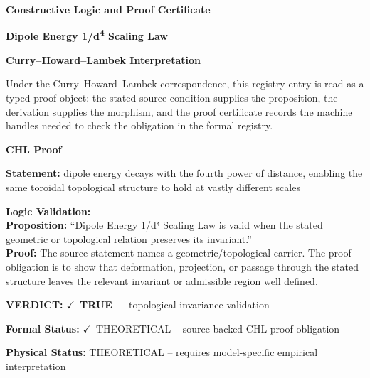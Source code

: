 \clearpage
\begingroup\tzpsupportsetup
\noindent\textbf{\fontsize{10.8pt}{12.8pt}\selectfont [ID 0140] Constructive Logic and Proof Certificate}\par
\noindent\textbf{\fontsize{10pt}{12pt}\selectfont Dipole Energy 1/d\textsuperscript{4} Scaling Law}\par
\vspace{0.45em}
\begingroup
\footnotesize
\setlength{\parskip}{0.22em}
\setlength{\parindent}{0pt}
\noindent\textbf{Curry--Howard--Lambek Interpretation}\par
Under the Curry--Howard--Lambek correspondence, this registry entry is read as a typed proof
object: the stated source condition supplies the proposition, the derivation supplies the
morphism, and the proof certificate records the machine handles needed to check the obligation
in the formal registry.

\vspace{0.45em}
\noindent\textbf{CHL Proof}\par
\textbf{Statement:} dipole energy decays with the fourth power of distance, enabling the same toroidal
topological structure to hold at vastly different scales

\textbf{Logic Validation:}\\
\textbf{Proposition:} ``Dipole Energy 1/d⁴ Scaling Law is valid when the stated geometric or topological
relation preserves its invariant.''\\
\textbf{Proof:} The source statement names a geometric/topological carrier. The proof obligation is to
show that deformation, projection, or passage through the stated structure leaves the
relevant invariant or admissible region well defined.

\textbf{VERDICT:} \ensuremath{\checkmark}\ \textbf{TRUE} --- topological-invariance validation

\textbf{Formal Status:} \ensuremath{\checkmark}\ THEORETICAL -- source-backed CHL proof obligation

\textbf{Physical Status:} THEORETICAL -- requires model-specific empirical interpretation
\par\vspace{0.45em}
\par
\ifTZPDarkEdition
{}
\fi
\endgroup
\endgroup

